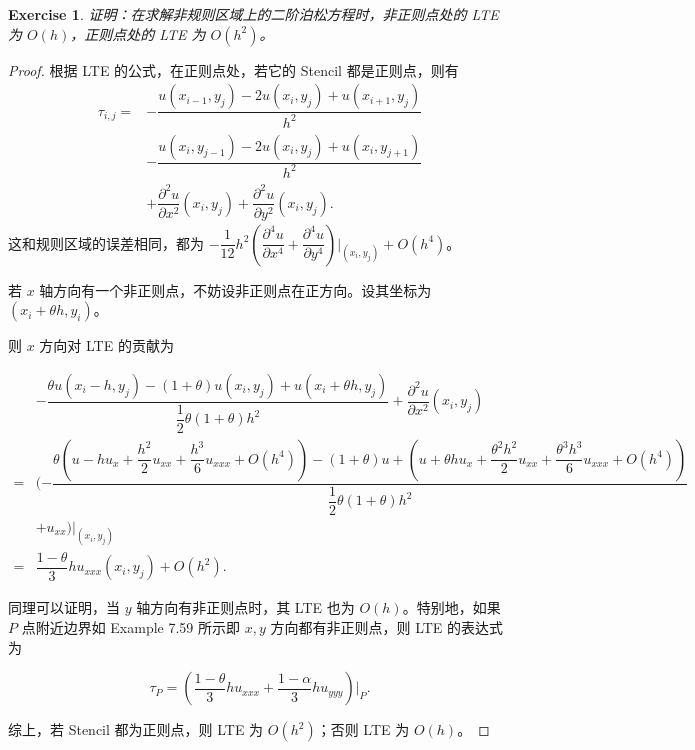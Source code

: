 \documentclass{ctexart}
\newtheorem{ex}{Exercise}
\begin{document}
\begin{ex}
    证明：在求解非规则区域上的二阶泊松方程时，非正则点处的 LTE 为 $O(h)$，正则点处的 LTE 为 $O(h^2)$。
\end{ex}

\begin{proof}
    根据 LTE 的公式，在正则点处，若它的 Stencil 都是正则点，则有
    \begin{equation}
        \begin{split}
            \tau_{i,j} = &-\dfrac {u(x_{i-1},y_j) - 2u(x_i,y_j) + u(x_{i+1},y_j)}{h^2}\\ &- \dfrac {u(x_i,y_{j-1}) - 2u(x_i,y_j) + u(x_i,y_{j+1})}{h^2}\\ &+ \dfrac{\partial^2u}{\partial x^2}(x_i,y_j) + \dfrac{\partial^2u}{\partial y^2}(x_i,y_j).
        \end{split}
    \end{equation}
    这和规则区域的误差相同，都为 $-\dfrac 1{12}h^2(\dfrac{\partial^4u}{\partial x^4}+\dfrac{\partial^4u}{\partial y^4})|_{(x_i,y_j)} + O(h^4)$。

    若 $x$ 轴方向有一个非正则点，不妨设非正则点在正方向。设其坐标为 $(x_i+\theta h,y_i)$。

    则 $x$ 方向对 LTE 的贡献为

    \begin{equation}
        \begin{split}
            & -\dfrac{\theta u(x_i-h,y_j)-(1+\theta)u(x_i,y_j)+u(x_i+\theta h,y_j)}{\dfrac 12 \theta(1+\theta)h^2}+\dfrac {\partial^2 u}{\partial x^2}(x_i,y_j)\\
            = & (-\dfrac{\theta(u - hu_x + \dfrac{h^2}2 u_{xx} + \dfrac{h^3}6 u_{xxx} + O(h^4)) - (1+\theta)u + (u + \theta h u_x + \dfrac{\theta^2h^2}2 u_{xx} + \dfrac{\theta^3h^3}6 u_{xxx} + O(h^4))}{\dfrac 12 \theta(1+\theta)h^2} \\ & + u_{xx})|_{(x_i,y_j)}\\
            = & \dfrac {1-\theta}3 hu_{xxx}(x_i,y_j) + O(h^2).
        \end{split}
    \end{equation}

    同理可以证明，当 $y$ 轴方向有非正则点时，其 LTE 也为 $O(h)$。特别地，如果 $P$ 点附近边界如 Example 7.59 所示即 $x,y$ 方向都有非正则点，则 LTE 的表达式为

    \begin{equation}
        \tau_P = (\dfrac {1-\theta}3 hu_{xxx} + \dfrac {1-\alpha}3 hu_{yyy})|_P.
    \end{equation}
    
    综上，若 Stencil 都为正则点，则 LTE 为 $O(h^2)$；否则 LTE 为 $O(h)$。
\end{proof}
\end{document}
